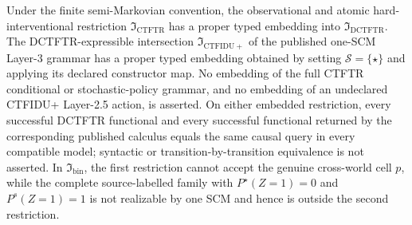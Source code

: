 Under the finite semi-Markovian convention, the observational and atomic hard-interventional restriction \(\mathfrak I_{\mathrm{CTFTR}}\) has a proper typed embedding into \(\mathfrak I_{\mathrm{DCTFTR}}\).  The DCTFTR-expressible intersection \(\mathfrak I_{\mathrm{CTFIDU+}}\) of the published one-SCM Layer-3 grammar has a proper typed embedding obtained by setting \(\mathcal S=\{\star\}\) and applying its declared constructor map.  No embedding of the full CTFTR conditional or stochastic-policy grammar, and no embedding of an undeclared CTFIDU+ Layer-2.5 action, is asserted.  On either embedded restriction, every successful DCTFTR functional and every successful functional returned by the corresponding published calculus equals the same causal query in every compatible model; syntactic or transition-by-transition equivalence is not asserted.  In \(\mathfrak I_{\mathrm{bin}}\), the first restriction cannot accept the genuine cross-world cell \(p\), while the complete source-labelled family with \(P^\star(Z=1)=0\) and \(P^s(Z=1)=1\) is not realizable by one SCM and hence is outside the second restriction.